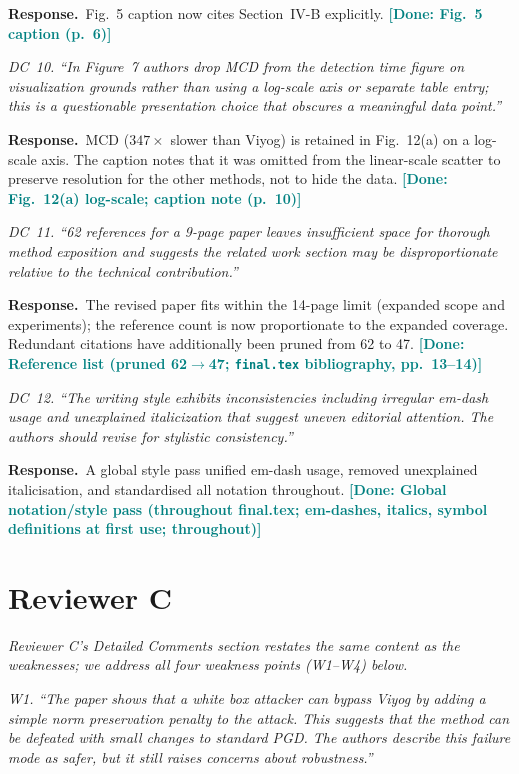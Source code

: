 \documentclass[10pt,letterpaper,journal]{IEEEtran}
\newcommand{\rc}[1]{\smallskip\noindent\textit{\textcolor{black!75}{#1}}\par\smallskip}
\newcommand{\rr}{\noindent\textbf{Response.}~}
\newcommand{\done}[1]{\textcolor{teal}{\textbf{[Done: #1]}}}
\begin{document}
\rr Fig.~5 caption now cites Section~IV-B explicitly.
\done{Fig.~5 caption (p.~6)}

\rc{DC~10. ``In Figure~7 authors drop MCD from the detection time figure on
visualization grounds rather than using a log-scale axis or separate table entry;
this is a questionable presentation choice that obscures a meaningful data point.''}

\rr MCD ($347\times$ slower than Viyog) is retained in Fig.~12(a) on a log-scale
axis. The caption notes that it was omitted from the linear-scale scatter to
preserve resolution for the other methods, not to hide the data.
\done{Fig.~12(a) log-scale; caption note (p.~10)}

\rc{DC~11. ``62 references for a 9-page paper leaves insufficient space for thorough
method exposition and suggests the related work section may be disproportionate
relative to the technical contribution.''}

\rr The revised paper fits within the 14-page limit (expanded scope and
experiments); the reference count is now proportionate to the expanded coverage.
Redundant citations have additionally been pruned from 62 to 47.
\done{Reference list (pruned 62$\to$47; \texttt{final.tex} bibliography, pp.~13--14)}

\rc{DC~12. ``The writing style exhibits inconsistencies including irregular em-dash
usage and unexplained italicization that suggest uneven editorial attention. The
authors should revise for stylistic consistency.''}

\rr A global style pass unified em-dash usage, removed unexplained italicisation,
and standardised all notation throughout.
\done{Global notation/style pass (throughout final.tex; em-dashes, italics, symbol definitions at first use; throughout)}

\section*{Reviewer C}
\noindent\textit{Reviewer C's Detailed Comments
section restates the same content as the weaknesses; we address all four weakness
points (W1--W4) below.}

\rc{W1. ``The paper shows that a white box attacker can bypass Viyog by adding a
simple norm preservation penalty to the attack. This suggests that the method can be
defeated with small changes to standard PGD. The authors describe this failure mode
as safer, but it still raises concerns about robustness.''}
\end{document}
